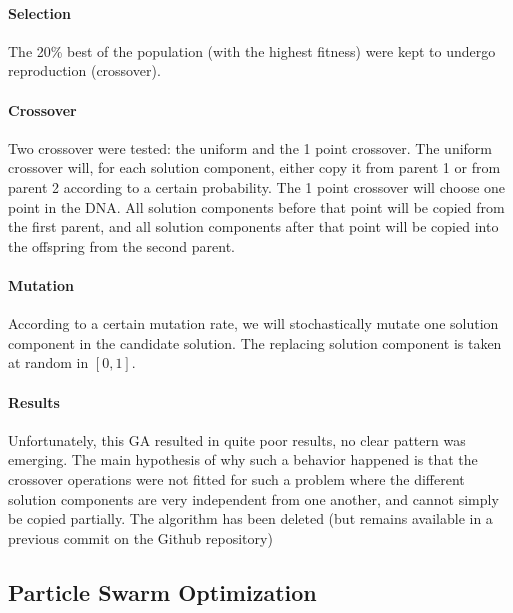         \paragraph{Selection} The 20\% best of the population (with the highest fitness) were kept to undergo reproduction (crossover).

        \paragraph{Crossover} Two crossover were tested: the uniform and the 1 point crossover. The uniform crossover will, for each solution component, either copy it from parent 1 or from parent 2 according to a certain probability. The 1 point crossover will choose one point in the DNA. All solution components before that point will be copied from the first parent, and all solution components after that point will be copied into the offspring from the second parent.

        \paragraph{Mutation} According to a certain mutation rate, we will stochastically mutate one solution component in the candidate solution. The replacing solution component is taken at random in $[0, 1]$.

        \paragraph{Results} Unfortunately, this GA resulted in quite poor results, no clear pattern was emerging. The main hypothesis of why such a behavior happened is that the crossover operations were not fitted for such a problem where the different solution components are very independent from one another, and cannot simply be copied partially. The algorithm has been deleted (but remains available in a previous commit on the Github repository)

    \subsection{Particle Swarm Optimization}

